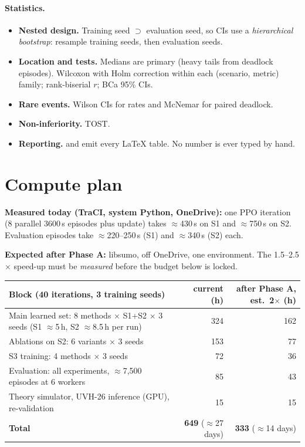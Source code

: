 \documentclass[11pt,a4paper]{article}
\newcommand{\file}[1]{\texttt{\detokenize{#1}}}
\begin{document}
\paragraph{Statistics.}
\begin{itemize}
\item \textbf{Nested design.} Training seed $\supset$ evaluation seed, so CIs use a
      \emph{hierarchical bootstrap}: resample training seeds, then evaluation seeds.
\item \textbf{Location and tests.} Medians are primary (heavy tails from deadlock episodes).
      Wilcoxon with Holm correction within each (scenario, metric) family; rank-biserial
      $r$; BCa 95\% CIs.
\item \textbf{Rare events.} Wilson CIs for rates and McNemar for paired deadlock.
\item \textbf{Non-inferiority.} TOST.
\item \textbf{Reporting.} \file{eval/stats.py} and \file{eval/report.py} emit every LaTeX
      table. No number is ever typed by hand.
\end{itemize}

\section{Compute plan}
\textbf{Measured today (TraCI, system Python, OneDrive):} one PPO iteration (8 parallel
3600\,s episodes plus update) takes $\approx$430\,s on S1 and $\approx$750\,s on S2.
Evaluation episodes take $\approx$220--250\,s (S1) and $\approx$340\,s (S2) each.

\textbf{Expected after Phase A:} libsumo, off OneDrive, one environment. The 1.5--2.5$\times$
speed-up must be \emph{measured} before the budget below is locked.

\small
\begin{tabularx}{\textwidth}{@{}Xrr@{}}
\toprule
Block (40 iterations, 3 training seeds) & current (h) & after Phase A, est.\ 2$\times$ (h) \\
\midrule
Main learned set: 8 methods $\times$ S1+S2 $\times$ 3 seeds (S1 $\approx$5\,h, S2 $\approx$8.5\,h per run) & 324 & 162 \\
Ablations on S2: 6 variants $\times$ 3 seeds & 153 & 77 \\
S3 training: 4 methods $\times$ 3 seeds & 72 & 36 \\
Evaluation: all experiments, $\approx$7{,}500 episodes at 6 workers & 85 & 43 \\
Theory simulator, UVH-26 inference (GPU), re-validation & 15 & 15 \\
\midrule
\textbf{Total} & \textbf{649} ($\approx$27 days) & \textbf{333} ($\approx$14 days) \\
\bottomrule
\end{tabularx}
\normalsize
\end{document}
